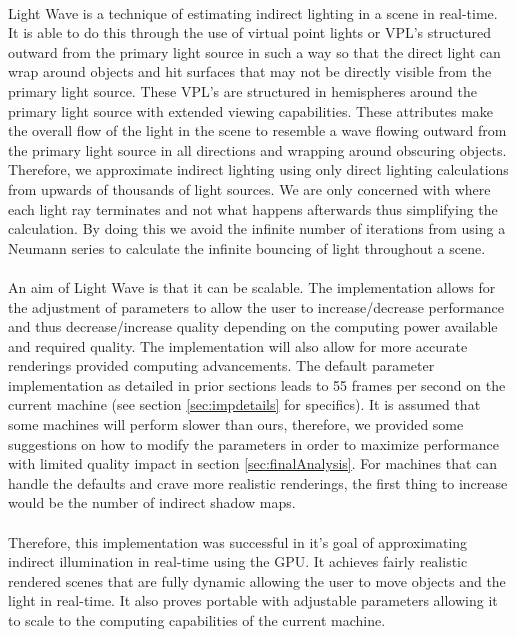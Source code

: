 \paragraph{}
Light Wave is a technique of estimating indirect lighting in a scene in real-time.  It is able to do this through the use of virtual point lights or VPL's structured outward from the primary light source in such a way so that the direct light can wrap around objects and hit surfaces that may not be directly visible from the primary light source.  These VPL's are structured in hemispheres around the primary light source with extended viewing capabilities.  These attributes make the overall flow of the light in the scene to resemble a wave flowing outward from the primary light source in all directions and wrapping around obscuring objects.  Therefore, we approximate indirect lighting using only direct lighting calculations from upwards of thousands of light sources.  We are only concerned with where each light ray terminates and not what happens afterwards thus simplifying the calculation.  By doing this we avoid the infinite number of iterations from using a Neumann series to calculate the infinite bouncing of light throughout a scene.

\paragraph{}
An aim of Light Wave is that it can be scalable.  The implementation allows for the adjustment of parameters to allow the user to increase/decrease performance and thus decrease/increase quality depending on the computing power available and required quality.  The implementation will also allow for more accurate renderings provided computing advancements.  The default parameter implementation as detailed in prior sections leads to 55 frames per second on the current machine (see section \ref{sec:impdetails} for specifics).  It is assumed that some machines will perform slower than ours, therefore, we provided some suggestions on how to modify the parameters in order to maximize performance with limited quality impact in section \ref{sec:finalAnalysis}.  For machines that can handle the defaults and crave more realistic renderings, the first thing to increase would be the number of indirect shadow maps.

\paragraph{}
Therefore, this implementation was successful in it's goal of approximating indirect illumination in real-time using the GPU.  It achieves fairly realistic rendered scenes that are fully dynamic allowing the user to move objects and the light in real-time.  It also proves portable with adjustable parameters allowing it to scale to the computing capabilities of the current machine.

